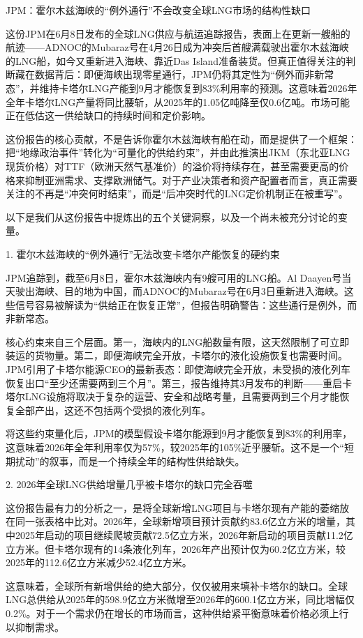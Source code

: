 \documentclass[11pt]{ctexart}
\begin{document}
JPM：霍尔木兹海峡的“例外通行”不会改变全球LNG市场的结构性缺口

这份JPM在6月8日发布的全球LNG供应与航运追踪报告，表面上在更新一艘船的航迹——ADNOC的Mubaraz号在4月26日成为冲突后首艘满载驶出霍尔木兹海峡的LNG船，如今又重新进入海峡、靠近Das Island准备装货。但真正值得关注的判断藏在数据背后：即便海峡出现零星通行，JPM仍将其定性为“例外而非新常态”，并维持卡塔尔LNG产能到9月才能恢复到83\%利用率的预测。这意味着2026年全年卡塔尔LNG产量将同比腰斩，从2025年的1.05亿吨降至仅0.6亿吨。市场可能正在低估这一供给缺口的持续时间和定价影响。

这份报告的核心贡献，不是告诉你霍尔木兹海峡有船在动，而是提供了一个框架：把“地缘政治事件”转化为“可量化的供给约束”，并由此推演出JKM（东北亚LNG现货价格）对TTF（欧洲天然气基准价）的溢价将持续存在，甚至需要更高的价格来抑制亚洲需求、支撑欧洲储气。对于产业决策者和资产配置者而言，真正需要关注的不再是“冲突何时结束”，而是“后冲突时代的LNG定价机制正在被重写”。

以下是我们从这份报告中提炼出的五个关键洞察，以及一个尚未被充分讨论的变量。

1. 霍尔木兹海峡的“例外通行”无法改变卡塔尔产能恢复的硬约束

JPM追踪到，截至6月8日，霍尔木兹海峡内有9艘可用的LNG船。Al Daayen号当天驶出海峡、目的地为中国，而ADNOC的Mubaraz号在6月3日重新进入海峡。这些信号容易被解读为“供给正在恢复正常”，但报告明确警告：这些通行是例外，而非新常态。

核心约束来自三个层面。第一，海峡内的LNG船数量有限，这天然限制了可立即装运的货物量。第二，即便海峡完全开放，卡塔尔的液化设施恢复也需要时间。JPM引用了卡塔尔能源CEO的最新表态：即使海峡完全开放，未受损的液化列车恢复出口“至少还需要两到三个月”。第三，报告维持其3月发布的判断——重启卡塔尔LNG设施将取决于复杂的运营、安全和战略考量，且需要两到三个月才能恢复全部产出，这还不包括两个受损的液化列车。

将这些约束量化后，JPM的模型假设卡塔尔能源到9月才能恢复到83\%的利用率，这意味着2026年全年利用率仅为57\%，较2025年的105\%近乎腰斩。这不是一个“短期扰动”的叙事，而是一个持续全年的结构性供给缺失。

2. 2026年全球LNG供给增量几乎被卡塔尔的缺口完全吞噬

这份报告最有力的分析之一，是将全球新增LNG项目与卡塔尔现有产能的萎缩放在同一张表格中比对。2026年，全球新增项目预计贡献约83.6亿立方米的增量，其中2025年启动的项目继续爬坡贡献72.5亿立方米，2026年新启动的项目贡献11.2亿立方米。但卡塔尔现有的14条液化列车，2026年产出预计仅为60.2亿立方米，较2025年的112.6亿立方米减少52.4亿立方米。

这意味着，全球所有新增供给的绝大部分，仅仅被用来填补卡塔尔的缺口。全球LNG总供给从2025年的598.9亿立方米微增至2026年的600.1亿立方米，同比增幅仅0.2\%。对于一个需求仍在增长的市场而言，这种供给紧平衡意味着价格必须上行以抑制需求。
\end{document}
